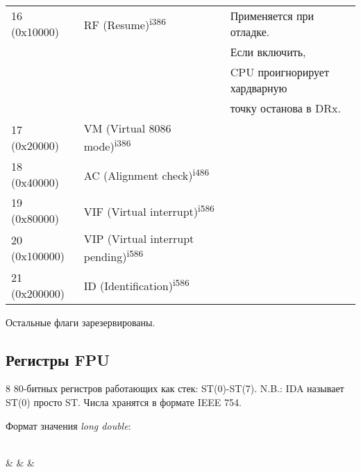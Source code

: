\begin{center}
\begin{tabular}{ | l | l | l | }
\hline
16 (0x10000) & RF (Resume)\textsuperscript{i386} & Применяется при отладке. \\
             &                  & Если включить, \\
	     &                  & CPU проигнорирует хардварную \\
             &                  & точку останова в DRx. \\
\hline
17 (0x20000) & VM (Virtual 8086 mode)\textsuperscript{i386} & \\
\hline
18 (0x40000) & AC (Alignment check)\textsuperscript{i486} & \\
\hline
19 (0x80000) & VIF (Virtual interrupt)\textsuperscript{i586} & \\
\hline
20 (0x100000) & VIP (Virtual interrupt pending)\textsuperscript{i586} & \\
\hline
21 (0x200000) & ID (Identification)\textsuperscript{i586} & \\
\hline
\end{tabular}
\end{center}
\normalsize

Остальные флаги зарезервированы.

\subsection{Регистры FPU}

8 80-битных регистров работающих как стек: ST(0)-ST(7).
N.B.: \ac{IDA} называет ST(0) просто ST.
Числа хранятся в формате IEEE 754.

Формат значения \emph{long double}:

\bigskip
\begin{center}
\begingroup
\makeatletter
\let\saved@bf@bitformatting\bf@bitformatting
\renewcommand*{\bf@bitformatting}{%
	\ifnum\value{header@val}=21 %
	\value{header@val}=62 %
	\else\ifnum\value{header@val}=22 %
	\value{header@val}=63 %
	\else\ifnum\value{header@val}=23 %
	\value{header@val}=64 %
	\else\ifnum\value{header@val}=30 %
	\value{header@val}=78 %
	\else\ifnum\value{header@val}=31 %
	\value{header@val}=79 %
	\fi\fi\fi\fi\fi
	\saved@bf@bitformatting
}%
\begin{bytefield}[bitwidth=0.03\linewidth]{32}
	 \\
	 &
	 &
	 &
\end{bytefield}
\endgroup
\end{center}

